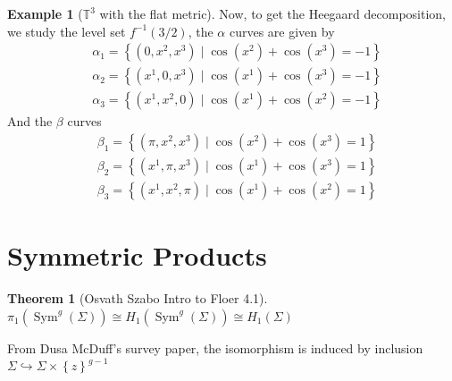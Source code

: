 \documentclass[10.5pt]{article}
\theoremstyle{definition}
\newtheorem{example}{Example}
\newtheorem{theorem}{Theorem}
\numberwithin{proposition}{subsection}
\numberwithin{pb}{subsection}
\newcommand{\set}[1]{\left\{#1\right\}}
\begin{document}
\begin{example}[\(\mathbb{T}^3\) with the flat metric]
        Now, to get the Heegaard decomposition, we study the level set \(f^{-1}(3/2)\), the \(\alpha\) curves are given by
        \begin{align}
            &\alpha_1 = \set{(0,x^2,x^3)\mid \cos(x^2) + \cos(x^3) = -1}\\
            &\alpha_2 = \set{(x^1,0,x^3)\mid \cos(x^1) + \cos(x^3) = -1}\\
            &\alpha_3 = \set{(x^1,x^2,0)\mid \cos(x^1) + \cos(x^2) = -1}
        \end{align}
        And the \(\beta\) curves
        \begin{align}
            &\beta_1 = \set{(\pi,x^2,x^3)\mid \cos(x^2) + \cos(x^3) = 1}\\
            &\beta_2 = \set{(x^1,\pi,x^3)\mid \cos(x^1) + \cos(x^3) = 1}\\
            &\beta_3 = \set{(x^1,x^2,\pi)\mid \cos(x^1) + \cos(x^2) = 1}
        \end{align}
    \end{example}

    \section{Symmetric Products}
    \begin{theorem}[Osvath Szabo Intro to Floer 4.1]
        \(\pi_1(\operatorname{Sym}^g(\Sigma)) \cong H_1(\operatorname{Sym}^g(\Sigma)) \cong H_1(\Sigma)\)

        From Dusa McDuff's survey paper, the isomorphism is induced by inclusion \(\Sigma \hookrightarrow \Sigma \times \set{z}^{g-1}\)
    \end{theorem}
\end{document}
